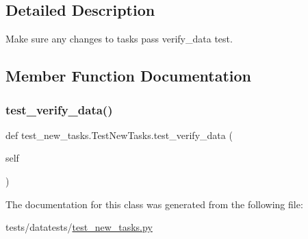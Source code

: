 \subsection{Detailed Description}
\begin{DoxyVerb}Make sure any changes to tasks pass verify_data test.
\end{DoxyVerb}
 

\subsection{Member Function Documentation}
\mbox{\label{classtest__new__tasks_1_1TestNewTasks_af52063eb5d4e045a1546f00c3ded043a}} 
\subsubsection{\texorpdfstring{test\+\_\+verify\+\_\+data()}{test\_verify\_data()}}
{\footnotesize\ttfamily def test\+\_\+new\+\_\+tasks.\+Test\+New\+Tasks.\+test\+\_\+verify\+\_\+data (\begin{DoxyParamCaption}\item[{}]{self }\end{DoxyParamCaption})}



The documentation for this class was generated from the following file\+:\begin{DoxyCompactItemize}
\item 
tests/datatests/\hyperlink{test__new__tasks_8py}{test\+\_\+new\+\_\+tasks.\+py}\end{DoxyCompactItemize}
